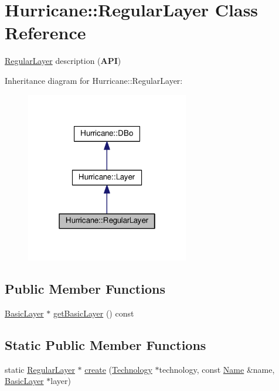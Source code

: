 \hypertarget{classHurricane_1_1RegularLayer}{}\section{Hurricane\+:\+:Regular\+Layer Class Reference}
\label{classHurricane_1_1RegularLayer}


\mbox{\hyperlink{classHurricane_1_1RegularLayer}{Regular\+Layer}} description ({\bfseries A\+PI})  




Inheritance diagram for Hurricane\+:\+:Regular\+Layer\+:\nopagebreak
\begin{figure}[H]
\begin{center}
\leavevmode
\includegraphics[width=202pt]{classHurricane_1_1RegularLayer__inherit__graph}
\end{center}
\end{figure}
\subsection*{Public Member Functions}
\begin{DoxyCompactItemize}
\item 
\mbox{\hyperlink{classHurricane_1_1BasicLayer}{Basic\+Layer}} $\ast$ \mbox{\hyperlink{classHurricane_1_1RegularLayer_a148c5839b544c2a0aa5d25be5958dfaf}{get\+Basic\+Layer}} () const
\end{DoxyCompactItemize}
\subsection*{Static Public Member Functions}
\begin{DoxyCompactItemize}
\item 
static \mbox{\hyperlink{classHurricane_1_1RegularLayer}{Regular\+Layer}} $\ast$ \mbox{\hyperlink{classHurricane_1_1RegularLayer_a6b40a35fec1c4fc168d608b8b96c8477}{create}} (\mbox{\hyperlink{classHurricane_1_1Technology}{Technology}} $\ast$technology, const \mbox{\hyperlink{classHurricane_1_1Name}{Name}} \&name, \mbox{\hyperlink{classHurricane_1_1BasicLayer}{Basic\+Layer}} $\ast$layer)
\end{DoxyCompactItemize}
